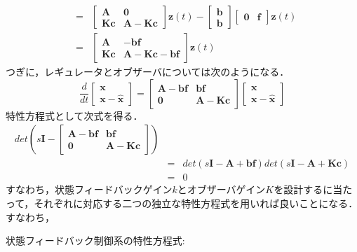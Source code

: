 \documentclass[12pt]{jsarticle}
\begin{document}
\begin{description}
\begin{eqnarray}
&=& \left[\begin{array}{cc}{\bm A}&{\bm 0}\\{\bm K}{\bm c}&{\bm A}-{\bm K}{\bm c}\end{array}\right] {\bm z}(t) - \left[\begin{array}{c}{\bm b}\\{\bm b}\end{array}\right] \left[\begin{array}{cc}{\bm 0}&{\bm f}\end{array}\right]{\bm z}(t) \nonumber \\
&=& \left[\begin{array}{cc}{\bm A}&-{\bm b}{\bm f}\\{\bm K}{\bm c}&{\bm A}-{\bm K}{\bm c}-{\bm b}{\bm f}\end{array}\right] {\bm z}(t)
\end{eqnarray}
  つぎに，レギュレータとオブザーバについては次のようになる．
\begin{equation}
  \frac{d}{dt} \left[\begin{array}{c}{\bm x}\\{\bm x}-\hat{\bm x}\end{array}\right] = \left[\begin{array}{cc}{\bm A}-{\bm b}{\bm f}&{\bm b}{\bm f}\\{\bm 0}&{\bm A}-{\bm K}{\bm c}\end{array}\right] \left[\begin{array}{c}{\bm x}\\{\bm x}-\hat{\bm x}\end{array}\right]
\end{equation}
特性方程式として次式を得る．
\begin{eqnarray}
  det( s{\bm I} - \left[\begin{array}{cc}{\bm A}-{\bm b}{\bm f}&{\bm b}{\bm f}\\{\bm 0}&{\bm A}-{\bm K}{\bm c}\end{array}\right] )\nonumber \\ &=& det(s{\bm I} - {\bm A} + {\bm b}{\bm f})det(s{\bm I} - {\bm A} + {\bm K}{\bm c}) \nonumber \\
  &=& 0
\end{eqnarray}
すなわち，状態フィードバックゲイン$k$とオブザーバゲイン$K$を設計するに当たって，それぞれに対応する二つの独立な特性方程式を用いれば良いことになる．すなわち，
  \begin{description}
    \item 状態フィードバック制御系の特性方程式:

\end{description}
\end{description}
\end{document}
